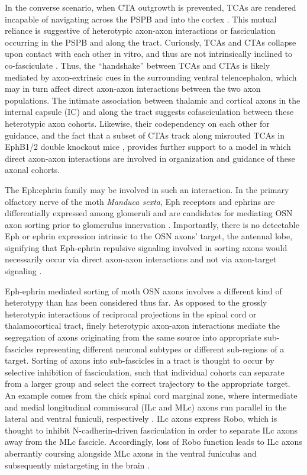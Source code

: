 In the converse scenario, when CTA outgrowth is prevented, TCAs are rendered incapable of navigating across the PSPB and into the cortex \cite{chen2012evidence}.
This mutual reliance is suggestive of heterotypic axon-axon interactions or fasciculation occurring in the PSPB and along the tract.
Curiously, TCAs and CTAs collapse upon contact with each other in vitro, and thus are not intrinsically inclined to co-fasciculate \cite{bagnard2001axonal}.
Thus, the ``handshake'' between TCAs and CTAs is likely mediated by axon-extrinsic cues in the surrounding ventral telencephalon, which may in turn affect direct axon-axon interactions between the two axon populations.
The intimate association between thalamic and cortical axons in the internal capsule (IC) and along the tract \cite{molnar1998mechanisms} suggests cofasciculation between these heterotypic axon cohorts.
Likewise, their codependency on each other for guidance, and the fact that a subset of CTAs track along misrouted TCAs in EphB1/2 double knockout mice \cite{robichaux2014ephb}, provides further support to a model in which direct axon-axon interactions are involved in organization and guidance of these axonal cohorts.

The Eph:ephrin family may be involved in such an interaction.
In the primary olfactory nerve of the moth \emph{Manduca sexta}, Eph receptors and ephrins are differentially expressed among glomeruli and are candidates for mediating OSN axon sorting prior to glomerulus innervation \cite{kaneko2003interaxonal}.
Importantly, there is no detectable Eph or ephrin expression intrinsic to the OSN axons’ target, the antennal lobe, signifying that Eph-ephrin repulsive signaling involved in sorting axons would necessarily occur via direct axon-axon interactions and not via axon-target signaling \cite{kaneko2003interaxonal}.

Eph-ephrin mediated sorting of moth OSN axons involves a different kind of heterotypy than has been considered thus far.
As opposed to the grossly heterotypic interactions of reciprocal projections in the spinal cord or thalamocortical tract, finely heterotypic axon-axon interactions mediate the segregation of axons originating from the same source into appropriate sub-fascicles representing different neuronal subtypes or different sub-regions of a target.
Sorting of axons into sub-fascicles in a tract is thought to occur by selective inhibition of fasciculation, such that individual cohorts can separate from a larger group and select the correct trajectory to the appropriate target.
An example comes from the chick spinal cord marginal zone, where intermediate and medial longitudinal commissural (ILc and MLc) axons run parallel in the lateral and ventral funiculi, respectively \cite{sakai2012axon}.
ILc axons express Robo, which is thought to inhibit N-cadherin-driven fasciculation in order to separate ILc axons away from the MLc fascicle.
Accordingly, loss of Robo function leads to ILc axons aberrantly coursing alongside MLc axons in the ventral funiculus and subsequently mistargeting in the brain \cite{sakai2012axon}.

